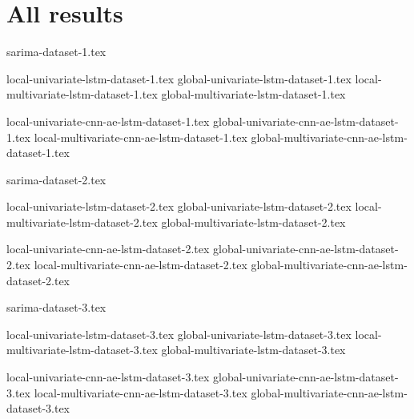 
\section{All results}
\label{appendix:all-results}


{sarima-dataset-1.tex}

{local-univariate-lstm-dataset-1.tex}
{global-univariate-lstm-dataset-1.tex}
{local-multivariate-lstm-dataset-1.tex}
{global-multivariate-lstm-dataset-1.tex}


{local-univariate-cnn-ae-lstm-dataset-1.tex}
{global-univariate-cnn-ae-lstm-dataset-1.tex}
{local-multivariate-cnn-ae-lstm-dataset-1.tex}
{global-multivariate-cnn-ae-lstm-dataset-1.tex}


{sarima-dataset-2.tex}

{local-univariate-lstm-dataset-2.tex}
{global-univariate-lstm-dataset-2.tex}
{local-multivariate-lstm-dataset-2.tex}
{global-multivariate-lstm-dataset-2.tex}

{local-univariate-cnn-ae-lstm-dataset-2.tex}
{global-univariate-cnn-ae-lstm-dataset-2.tex}
{local-multivariate-cnn-ae-lstm-dataset-2.tex}
{global-multivariate-cnn-ae-lstm-dataset-2.tex}

{sarima-dataset-3.tex}

{local-univariate-lstm-dataset-3.tex}
{global-univariate-lstm-dataset-3.tex}
{local-multivariate-lstm-dataset-3.tex}
{global-multivariate-lstm-dataset-3.tex}

{local-univariate-cnn-ae-lstm-dataset-3.tex}
{global-univariate-cnn-ae-lstm-dataset-3.tex}
{local-multivariate-cnn-ae-lstm-dataset-3.tex}
{global-multivariate-cnn-ae-lstm-dataset-3.tex}

